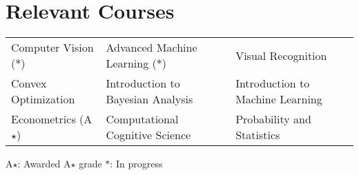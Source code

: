 \setlength\extrarowheight{3pt}  %

\section*{Relevant Courses}
\begin{tabularx}{\textwidth}{L L L}
    Computer Vision ($\ast$)&
    Advanced Machine Learning ($\ast$)&
    Visual Recognition\\
    Convex Optimization&
    Introduction to Bayesian Analysis&
    Introduction to Machine Learning\\
    Econometrics (A$\star$)&
    Computational Cognitive Science&
    Probability and Statistics
\end{tabularx}

\vspace{2mm}
{\small A$\star$: Awarded A$\star$ grade \hspace{5mm} $\ast$: In progress}
